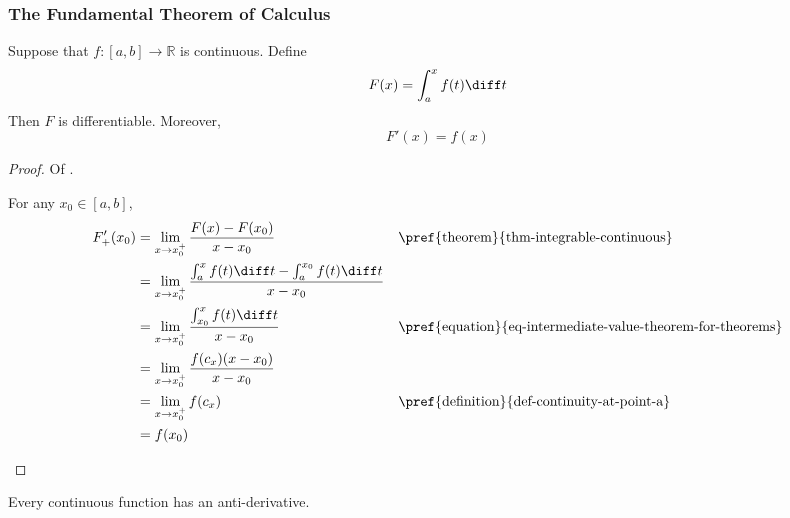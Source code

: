 \subsubsection{The Fundamental Theorem of Calculus}\label{subsubsec-the-fundamental-theorem-of-calculus}

\begin{thm}\label{thm-the-fundamental-theorem-of-calculus}
	Suppose that $f:[a,b]\to\mathbb{R}$ is continuous. Define
	\begin{equation*}
		F(x) = \int_a^x f(t) \diff t
	\end{equation*}
	Then $F$ is differentiable. Moreover,
	\begin{equation}
		F'(x) = f(x)
	\end{equation}
\end{thm}

\begin{proof}
	Of .
	\begin{flushleft}
		For any $x_0\in[a,b]$,
		\begin{align*}
			F_+'(x_0) & = \lim_{x \to x_0^+} \frac{F(x)-F(x_0)}{x-x_0}                                       &  & \text{\pref{theorem}{thm-integrable-continuous}}                   \\
			          & = \lim_{x \to x_0^+} \frac{\int_a^x f(t) \diff t - \int_a^{x_0} f(t) \diff t}{x-x_0}                                                                         \\
			          & = \lim_{x \to x_0^+} \frac{\int_{x_0}^x f(t) \diff t}{x-x_0}                         &  & \text{\pref{equation}{eq-intermediate-value-theorem-for-theorems}} \\
			          & = \lim_{x \to x_0^+} \frac{f(c_x)(x-x_0)}{x-x_0}                                                                                                             \\
			          & = \lim_{x \to x_0^+} f(c_x)                                                          &  & \text{\pref{definition}{def-continuity-at-point-a}}                \\
			          & = f(x_0)
		\end{align*}
	\end{flushleft}
\end{proof}

\begin{crl}\label{crl-continuity-implies-anti-derivative}
	Every continuous function has an anti-derivative.
\end{crl}

